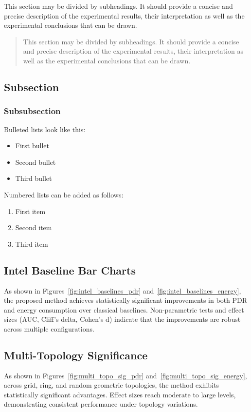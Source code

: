 \documentclass[sensors,article,submit,moreauthors]{Definitions/mdpi}
\begin{document}
This section may be divided by subheadings. It should provide a concise and precise description of the experimental results, their interpretation as well as the experimental conclusions that can be drawn.
\begin{quote}
This section may be divided by subheadings. It should provide a concise and precise description of the experimental results, their interpretation as well as the experimental conclusions that can be drawn.
\end{quote}

\subsection{Subsection}
\unskip
\subsubsection{Subsubsection}

Bulleted lists look like this:
\begin{itemize}[leftmargin=*,labelsep=5.8mm]
\item	First bullet
\item	Second bullet
\item	Third bullet
\end{itemize}

Numbered lists can be added as follows:
\begin{enumerate}[leftmargin=*,labelsep=4.9mm]
\item	First item 
\item	Second item
\item	Third item
\end{enumerate}

\subsection{Intel Baseline Bar Charts}
As shown in Figures~\ref{fig:intel_baselines_pdr} and~\ref{fig:intel_baselines_energy}, the proposed method achieves statistically significant improvements in both PDR and energy consumption over classical baselines. Non-parametric tests and effect sizes (AUC, Cliff’s delta, Cohen’s d) indicate that the improvements are robust across multiple configurations.

\subsection{Multi-Topology Significance}
As shown in Figures~\ref{fig:multi_topo_sig_pdr} and~\ref{fig:multi_topo_sig_energy}, across grid, ring, and random geometric topologies, the method exhibits statistically significant advantages. Effect sizes reach moderate to large levels, demonstrating consistent performance under topology variations.
\end{document}
